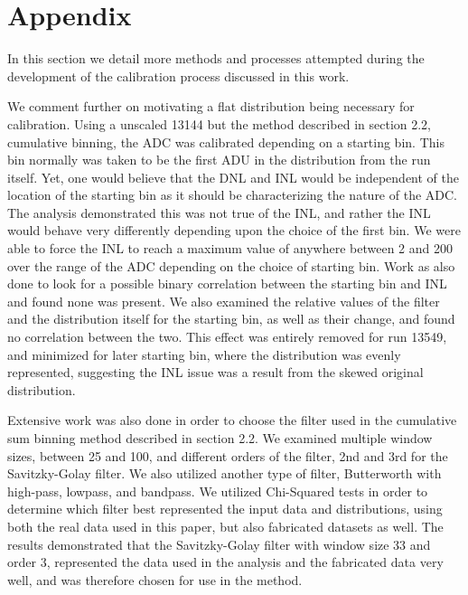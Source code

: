 \documentclass[11pt, letterpaper]{article}
\begin{document}
\section{Appendix}
\indent

In this section we detail more methods and processes attempted during the development of the calibration process discussed in this work. 
\indent


We comment further on motivating a flat distribution being necessary for calibration.
Using a unscaled 13144 but the method described in section 2.2, cumulative binning, the ADC was calibrated depending on a starting bin.
This bin normally was taken to be the first ADU in the distribution from the run itself. 
Yet, one would believe that the DNL and INL would be independent of the location of the starting bin as it should be characterizing the nature of the ADC.
The analysis demonstrated this was not true of the INL, and rather the INL would behave very differently depending upon the choice of the first bin. 
We were able to force the INL to reach a maximum value of anywhere between 2 and 200 over the range of the ADC depending on the choice of starting bin.
Work as also done to look for a possible binary correlation between the starting bin and INL and found none was present. 
We also examined the relative values of the filter and the distribution itself for the starting bin, as well as their change, and found no correlation between the two. 
This effect was entirely removed for run 13549, and minimized for later starting bin, where the distribution was evenly represented, suggesting the INL issue was a result from the skewed original distribution. 
 \indent 
 
Extensive work was also done in order to choose the filter used in the cumulative sum binning method described in section 2.2. 
We examined multiple window sizes, between 25 and 100, and different orders of the filter, 2nd and 3rd for the Savitzky-Golay filter. 
We also utilized another type of filter, Butterworth with high-pass, lowpass, and bandpass. 
We utilized Chi-Squared tests in order to determine which filter best represented the input data and distributions, using both the real data used in this paper, but also fabricated datasets as well. 
The results demonstrated that the Savitzky-Golay filter with window size 33 and order 3, represented the data used in the analysis and the fabricated data very well, and was therefore chosen for use in the method. 
 \indent 
\end{document}

